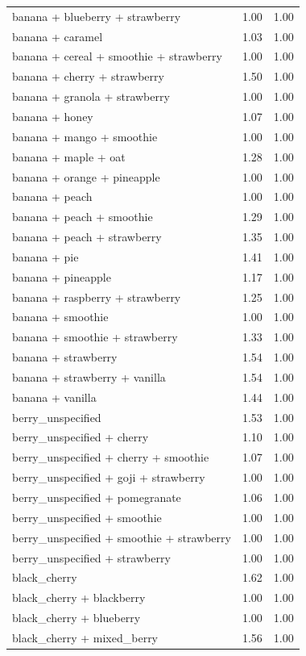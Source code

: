\begin{table}
\begin{tabular}{lrr}
banana + blueberry + strawberry & 1.00 & 1.00 \\
banana + caramel & 1.03 & 1.00 \\
banana + cereal + smoothie + strawberry & 1.00 & 1.00 \\
banana + cherry + strawberry & 1.50 & 1.00 \\
banana + granola + strawberry & 1.00 & 1.00 \\
banana + honey & 1.07 & 1.00 \\
banana + mango + smoothie & 1.00 & 1.00 \\
banana + maple + oat & 1.28 & 1.00 \\
banana + orange + pineapple & 1.00 & 1.00 \\
banana + peach & 1.00 & 1.00 \\
banana + peach + smoothie & 1.29 & 1.00 \\
banana + peach + strawberry & 1.35 & 1.00 \\
banana + pie & 1.41 & 1.00 \\
banana + pineapple & 1.17 & 1.00 \\
banana + raspberry + strawberry & 1.25 & 1.00 \\
banana + smoothie & 1.00 & 1.00 \\
banana + smoothie + strawberry & 1.33 & 1.00 \\
banana + strawberry & 1.54 & 1.00 \\
banana + strawberry + vanilla & 1.54 & 1.00 \\
banana + vanilla & 1.44 & 1.00 \\
berry\_unspecified & 1.53 & 1.00 \\
berry\_unspecified + cherry & 1.10 & 1.00 \\
berry\_unspecified + cherry + smoothie & 1.07 & 1.00 \\
berry\_unspecified + goji + strawberry & 1.00 & 1.00 \\
berry\_unspecified + pomegranate & 1.06 & 1.00 \\
berry\_unspecified + smoothie & 1.00 & 1.00 \\
berry\_unspecified + smoothie + strawberry & 1.00 & 1.00 \\
berry\_unspecified + strawberry & 1.00 & 1.00 \\
black\_cherry & 1.62 & 1.00 \\
black\_cherry + blackberry & 1.00 & 1.00 \\
black\_cherry + blueberry & 1.00 & 1.00 \\
black\_cherry + mixed\_berry & 1.56 & 1.00 \\

\end{tabular}
\end{table}
